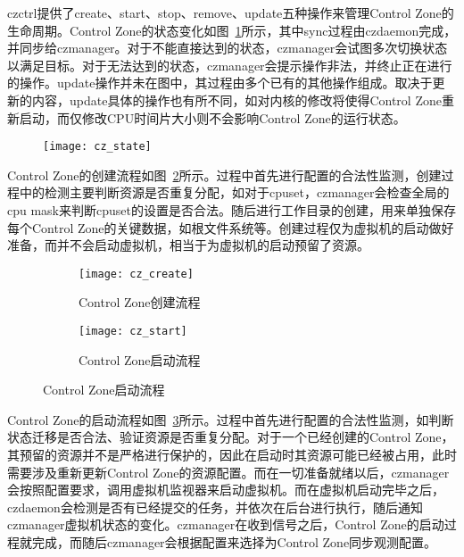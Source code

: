 czctrl提供了create、start、stop、remove、update五种操作来管理Control Zone的生命周期。Control Zone的状态变化如图~\ref{fig:cz_state}所示，其中sync过程由czdaemon完成，并同步给czmanager。对于不能直接达到的状态，czmanager会试图多次切换状态以满足目标。对于无法达到的状态，czmanager会提示操作非法，并终止正在进行的操作。update操作并未在图中，其过程由多个已有的其他操作组成。取决于更新的内容，update具体的操作也有所不同，如对内核的修改将使得Control Zone重新启动，而仅修改CPU时间片大小则不会影响Control Zone的运行状态。

\begin{figure}[!htbp]
    \centering
    \texttt{[image: cz\_state]}
    \label{fig:cz_state}
\end{figure}

Control Zone的创建流程如图~\ref{fig:cz_create}所示。过程中首先进行配置的合法性监测，创建过程中的检测主要判断资源是否重复分配，如对于cpuset，czmanager会检查全局的cpu mask来判断cpuset的设置是否合法。随后进行工作目录的创建，用来单独保存每个Control Zone的关键数据，如根文件系统等。创建过程仅为虚拟机的启动做好准备，而并不会启动虚拟机，相当于为虚拟机的启动预留了资源。

\begin{figure}[H]
    \centering
    \begin{subfigure}[b]{0.42\textwidth}
        \texttt{[image: cz\_create]}
        \caption{\quad Control Zone创建流程}
        \label{fig:cz_create}
    \end{subfigure}
    \hfill
    \begin{subfigure}[b]{0.56\textwidth}
        \texttt{[image: cz\_start]}
        \caption{\quad Control Zone启动流程}
        \label{fig:cz_start}
    \end{subfigure}
\label{fig:cz_create_start}
\end{figure}

Control Zone的启动流程如图~\ref{fig:cz_start}所示。过程中首先进行配置的合法性监测，如判断状态迁移是否合法、验证资源是否重复分配。对于一个已经创建的Control Zone，其预留的资源并不是严格进行保护的，因此在启动时其资源可能已经被占用，此时需要涉及重新更新Control Zone的资源配置。而在一切准备就绪以后，czmanager会按照配置要求，调用虚拟机监视器来启动虚拟机。而在虚拟机启动完毕之后，czdaemon会检测是否有已经提交的任务，并依次在后台进行执行，随后通知czmanager虚拟机状态的变化。czmanager在收到信号之后，Control Zone的启动过程就完成，而随后czmanager会根据配置来选择为Control Zone同步观测配置。

